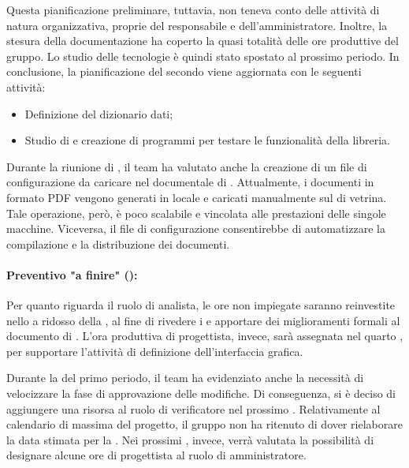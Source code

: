 \vspace{0.5\baselineskip}
\par Questa pianificazione preliminare, tuttavia, non teneva conto delle attività di natura organizzativa, proprie del responsabile e dell’amministratore. Inoltre, la stesura della documentazione ha coperto la quasi totalità delle ore produttive del gruppo. Lo studio delle tecnologie è quindi stato spostato al prossimo periodo. In conclusione, la pianificazione del secondo  viene aggiornata con le seguenti attività:
\begin{itemize}
  \item Definizione del dizionario dati;
  \item Studio di  e creazione di programmi per testare le funzionalità della libreria.
\end{itemize}

\vspace{0.5\baselineskip}
\par Durante la riunione di , il team ha valutato anche la creazione di un file di configurazione da caricare nel  documentale di . Attualmente, i documenti in formato PDF vengono generati in locale e caricati manualmente sul  di vetrina. Tale operazione, però, è poco scalabile e vincolata alle prestazioni delle singole macchine. Viceversa, il file di configurazione consentirebbe di automatizzare la compilazione e la distribuzione dei documenti.


\paragraph*{Preventivo "a finire" ():}
\par Per quanto riguarda il ruolo di analista, le ore non impiegate saranno reinvestite nello  a ridosso della , al fine di rivedere i  e apportare dei miglioramenti formali al documento di \AdR. L'ora produttiva di progettista, invece, sarà assegnata nel quarto , per supportare l'attività di definizione dell'interfaccia grafica.

\vspace{0.5\baselineskip}
\par Durante la  del primo periodo, il team ha evidenziato anche la necessità di velocizzare la fase di approvazione delle modifiche. Di conseguenza, si è deciso di aggiungere una risorsa al ruolo di verificatore nel prossimo . Relativamente al calendario di massima del progetto, il gruppo non ha ritenuto di dover rielaborare la data stimata per la . Nei prossimi , invece, verrà valutata la possibilità di designare alcune ore di progettista al ruolo di amministratore.

